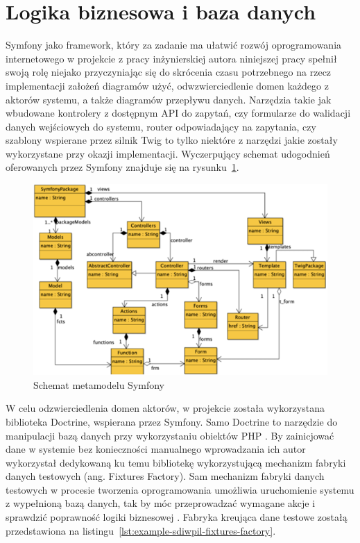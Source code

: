 \documentclass[12pt,oneside]{book}
\newcommand{\captionvspace}{\vspace{6pt}}
\begin{document}
    \section{Logika biznesowa i baza danych}

    Symfony jako framework, który za zadanie ma ułatwić rozwój oprogramowania internetowego w projekcie z pracy inżynierskiej autora niniejszej pracy spełnił swoją rolę niejako przyczyniając się do skrócenia czasu potrzebnego na rzecz implementacji założeń diagramów użyć, odwzwierciedlenie domen każdego z aktorów systemu, a także diagramów przepływu danych. Narzędzia takie jak wbudowane kontrolery z dostępnym API do zapytań, czy formularze do walidacji danych wejściowych do systemu, router odpowiadający na zapytania, czy szablony wspierane przez silnik Twig to tylko niektóre z narzędzi jakie zostały wykorzystane przy okazji implementacji. Wyczerpujący schemat udogodnień oferowanych przez Symfony znajduje się na rysunku~\ref{fig:symfony-metadata-scheme}.

    \begin{figure}[ht]
        \centering
        \includegraphics[width=\textwidth]{includes/images/symfony-metadata-scheme.png}
        \captionvspace
        \caption{Schemat metamodelu Symfony \cite{mod.driv.arch.symf}}
        \label{fig:symfony-metadata-scheme}
    \end{figure}

    W celu odzwierciedlenia domen aktorów, w projekcie została wykorzystana biblioteka Doctrine, wspierana przez Symfony. Samo Doctrine to narzędzie do manipulacji bazą danych przy wykorzystaniu obiektów PHP \cite{symf.5}. By zainicjować dane w systemie bez konieczności manualnego wprowadzania ich autor wykorzystał dedykowaną ku temu bibliotekę wykorzystującą mechanizm fabryki danych testowych (ang. Fixtures Factory). Sam mechanizm fabryki danych testowych w procesie tworzenia oprogramowania umożliwia uruchomienie systemu z wypełnioną bazą danych, tak by móc przeprowadzać wymagane akcje i sprawdzić poprawność logiki biznesowej \cite{fixtures}. Fabryka kreująca dane testowe zostałą przedstawiona na listingu~\ref{lst:example-sdiwpil-fixtures-factory}.
\end{document}
